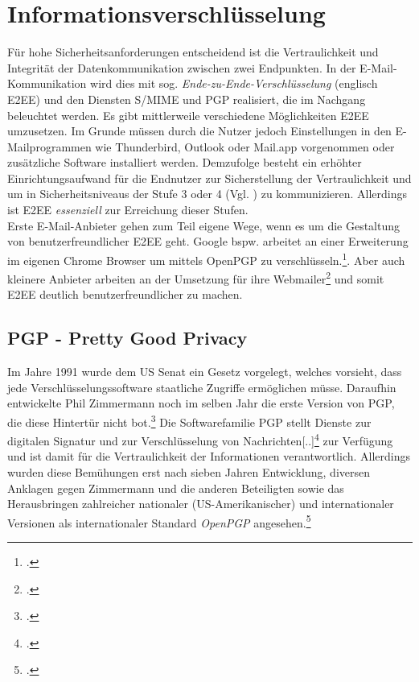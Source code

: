\documentclass  [paper=a4,
				fontsize=12pt,
				listof=totoc,
				bibliography=totoc
				]{scrreprt}
\begin{document}
		\section{Informationsverschlüsselung}
			Für hohe Sicherheitsanforderungen entscheidend ist die Vertraulichkeit und Integrität der Datenkommunikation zwischen zwei Endpunkten. In der E-Mail-Kommunikation wird dies mit sog. \textit{Ende-zu-Ende-Verschlüsselung} (englisch \ac{E2EE}) und den Diensten \ac{S/MIME} und \ac{PGP} realisiert, die im Nachgang beleuchtet werden.
			Es gibt mittlerweile verschiedene Möglichkeiten \ac{E2EE} umzusetzen. Im Grunde müssen durch die Nutzer jedoch Einstellungen in den E-Mailprogrammen wie Thunderbird, Outlook oder Mail.app vorgenommen oder zusätzliche Software installiert werden. Demzufolge besteht ein erhöhter Einrichtungsaufwand für die Endnutzer zur Sicherstellung der Vertraulichkeit und um in Sicherheitsniveaus der Stufe 3 oder 4 (Vgl. ) zu kommunizieren. Allerdings ist \ac{E2EE} \textit{essenziell} zur Erreichung dieser Stufen.\medskip\\
			Erste E-Mail-Anbieter gehen zum Teil eigene Wege, wenn es um die Gestaltung von benutzerfreundlicher \ac{E2EE} geht. Google bspw. arbeitet an einer Erweiterung im eigenen Chrome Browser um mittels OpenPGP zu verschlüsseln.\footcite[Vgl.][]{Somogyi2013}. Aber auch kleinere Anbieter arbeiten an der Umsetzung für ihre Webmailer\footcite[Vgl.][]{Posteo2013} und somit \ac{E2EE} deutlich benutzerfreundlicher zu machen. 
			
			\subsection{PGP - Pretty Good Privacy}
			\label{subsec:pgp}
				Im Jahre 1991 wurde dem US Senat ein Gesetz vorgelegt, welches vorsieht, dass jede Verschlüsselungssoftware staatliche Zugriffe ermöglichen müsse. Daraufhin entwickelte Phil Zimmermann noch im selben Jahr die erste Version von \ac{PGP}, die diese Hintertür nicht bot.\footcite[vgl.][S. 29]{Schwenk}\newpage
				Die Softwarefamilie \acl{PGP} stellt \glqq[..]Dienste zur digitalen Signatur und zur Verschlüsselung von Nachrichten[..]\grqq\footcite[][]{Mueller2011} zur Verfügung und ist damit für die Vertraulichkeit der Informationen verantwortlich.				
				Allerdings wurden diese Bemühungen erst nach sieben Jahren Entwicklung, diversen Anklagen gegen Zimmermann und die anderen Beteiligten sowie das Herausbringen zahlreicher nationaler (US-Amerikanischer) und internationaler Versionen als internationaler Standard \textit{OpenPGP} angesehen.\footcite[][S. 29-35]{Schwenk}
				\medskip
				
\end{document}
